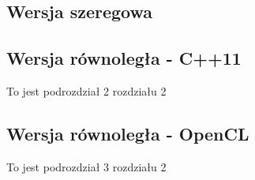 \documentclass[document.tex]{subfiles}
\begin{document}
\subsection{Wersja szeregowa}

 

 


\subsection{Wersja równoległa - C++11}
To jest podrozdział 2 rozdziału 2
\subsection{Wersja równoległa - OpenCL}
To jest podrozdział 3 rozdziału 2
\end{document}
